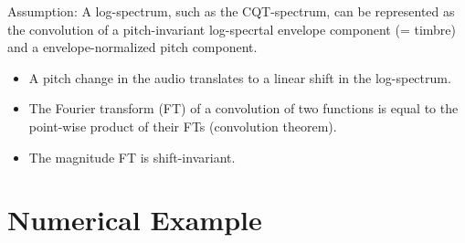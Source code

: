 \documentclass[journal]{IEEEtran}
\begin{document}
Assumption: A log-spectrum, such as the CQT-spectrum, can be represented as the convolution of a pitch-invariant log-specrtal envelope component (= timbre) and a envelope-normalized pitch component.

\begin{itemize}
\item A pitch change in the audio translates to a linear shift in the log-spectrum.
\item The Fourier transform (FT) of a convolution of two functions is equal to the point-wise product of their FTs (convolution theorem).
\item The magnitude FT is shift-invariant.
\end{itemize}



\section{Numerical Example}

%


\end{document}
